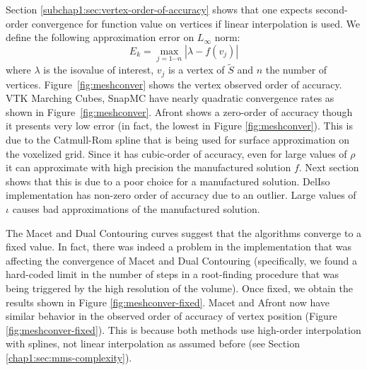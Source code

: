 Section \ref{subchap1:sec:vertex-order-of-accuracy} shows that one expects second-order 
convergence for function value on vertices if linear interpolation is used. 
We define the following approximation error on $L_\infty$ norm:
\begin{equation}
E_{k} = \max_{j=1\cdots n}|\lambda - f(v_{j})|
\label{eq:surferror}
\end{equation}
where $\lambda$ is the isovalue of interest, $v_j$ is a vertex of $\tilde{S}$ and 
$n$ the number of vertices. Figure~\ref{fig:meshconver} shows the vertex observed 
order of accuracy.
VTK Marching Cubes, SnapMC have nearly quadratic convergence rates 
as shown in Figure~\ref{fig:meshconver}. Afront shows a zero-order of accuracy 
though it presents very low error (in fact, the lowest in Figure \ref{fig:meshconver}). 
This is due to the Catmull-Rom spline that is being used for surface 
approximation on the voxelized grid. Since it has cubic-order of accuracy, 
even for large values of $\rho$  it can approximate with high precision 
the manufactured solution $f$. Next section shows that this is due to a poor 
choice for a manufactured solution. DelIso implementation has non-zero order 
of accuracy due to an outlier. Large values of $\iota$ causes bad approximations 
of the manufactured solution.


The Macet and Dual Contouring curves suggest that the algorithms converge to 
a fixed value. 
In fact, there was indeed a problem in the implementation
that was affecting the convergence of Macet and Dual Contouring
(specifically, we found a hard-coded limit in the number of steps in a
root-finding procedure that was being triggered by the high resolution
of the volume). Once fixed, we obtain the results shown in Figure
\ref{fig:meshconver-fixed}. Macet and Afront now have similar behavior 
in the observed order of accuracy of vertex position 
(Figure \ref{fig:meshconver-fixed}). This is because both methods use 
high-order interpolation with splines, not linear interpolation as 
assumed before (see Section \ref{chap1:sec:mms-complexity}).

